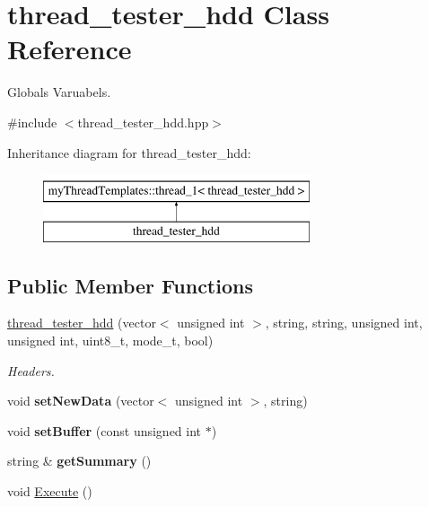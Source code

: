 \hypertarget{classthread__tester__hdd}{
\section{thread\_\-tester\_\-hdd Class Reference}
\label{classthread__tester__hdd}
}


Globals Varuabels.  




{\ttfamily \#include $<$thread\_\-tester\_\-hdd.hpp$>$}

Inheritance diagram for thread\_\-tester\_\-hdd:\begin{figure}[H]
\begin{center}
\leavevmode
\includegraphics[height=2cm]{classthread__tester__hdd}
\end{center}
\end{figure}
\subsection*{Public Member Functions}
\begin{DoxyCompactItemize}
\item 
\hypertarget{classthread__tester__hdd_ab318188f613c5b36e107084a8229f823}{
\hyperlink{classthread__tester__hdd_ab318188f613c5b36e107084a8229f823}{thread\_\-tester\_\-hdd} (vector$<$ unsigned int $>$, string, string, unsigned int, unsigned int, uint8\_\-t, mode\_\-t, bool)}
\label{classthread__tester__hdd_ab318188f613c5b36e107084a8229f823}

\begin{DoxyCompactList}\small\item\em Headers. \item\end{DoxyCompactList}\item 
\hypertarget{classthread__tester__hdd_ab630709c819674b3eed419e96125d5f1}{
void {\bfseries setNewData} (vector$<$ unsigned int $>$, string)}
\label{classthread__tester__hdd_ab630709c819674b3eed419e96125d5f1}

\item 
\hypertarget{classthread__tester__hdd_a56a89f631010469f197daa1375a4709f}{
void {\bfseries setBuffer} (const unsigned int $\ast$)}
\label{classthread__tester__hdd_a56a89f631010469f197daa1375a4709f}

\item 
\hypertarget{classthread__tester__hdd_a4dff9184fba9308a5803c297c349d075}{
string \& {\bfseries getSummary} ()}
\label{classthread__tester__hdd_a4dff9184fba9308a5803c297c349d075}

\item 
void \hyperlink{classthread__tester__hdd_a9d9f6f67783301bb7d1b9859ecd932c0}{Execute} ()
\end{DoxyCompactItemize}


